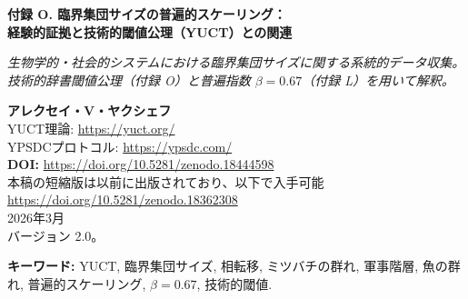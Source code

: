 \documentclass[12pt]{article}
\theoremstyle{remark}
\begin{document}
	
	\begin{titlepage}
		\begin{center}
			\vspace*{0.5cm}
			\Huge\textbf{付録 O. 臨界集団サイズの普遍的スケーリング：\\ 経験的証拠と技術的閾値公理（YUCT）との関連}
			
			\vspace{0.3cm}
			\small\textit{生物学的・社会的システムにおける臨界集団サイズに関する系統的データ収集。技術的辞書閾値公理（付録 O）と普遍指数 \(\beta = 0.67\)（付録 L）を用いて解釈。}
			
			\vspace{0.3cm}
			\small\textbf{アレクセイ・V・ヤクシェフ} \\
			YUCT理論: \url{https://yuct.org/}\\
			YPSDCプロトコル: \url{https://ypsdc.com/}\\
			
			\vspace{2cm}
			\textbf{DOI:} \url{https://doi.org/10.5281/zenodo.18444598}\\
			
			\vspace{1cm}
			\large 
			本稿の短縮版は以前に出版されており、以下で入手可能\\
			\url{https://doi.org/10.5281/zenodo.18362308}\\
			\vspace{1cm}
			2026年3月 \\ \large バージョン 2.0。
			
			\vspace{0.5cm}
			\begin{minipage}{0.95\textwidth}
				\begin{abstract}
					\noindent
					本付録では、群れ、分裂、構造再編などの相転移が生じる臨界サイズに関する経験的データを収集する。調査対象には、ミツバチのコロニー、軍事ユニット、魚の群れ、イルカのポッド、家畜個体群、霊長類のグループが含まれる。普遍的誤差スケーリング則 \(\varepsilon \propto N^{\beta}\)（\(\beta = 0.67\)，付録 L）と技術的辞書閾値公理（付録 O）を用いて、転移が生じる臨界サイズ \(N_{\text{crit}}\) と最適集団サイズ \(N_{\text{opt}}\) の間の定量的関係を導出する。多様なシステムで観測された比 \(N_{\text{crit}}/N_{\text{opt}}\) は \(\beta = 0.67\) と整合する値の周りに集まっており、この指数の普遍性と、技術的（または組織的）閾値を超えることが調整効率の相転移に対応するという考え方に対する独立した支持を提供する。さらに、YUCTフレームワークをさらに検証できる将来の実験や野外研究のための具体的で検証可能な予測を提案する。
				\end{abstract}
			\end{minipage}
			
			\vspace{0.3cm}
			\noindent
			\small\textbf{キーワード:} YUCT, 臨界集団サイズ, 相転移, ミツバチの群れ, 軍事階層, 魚の群れ, 普遍的スケーリング, \(\beta = 0.67\), 技術的閾値.
		\end{center}
	\end{titlepage}
	
\end{document}
